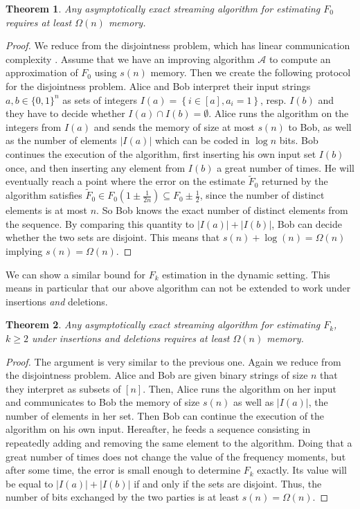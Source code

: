 \documentclass[a4paper,11pt,oneside,english,onecolumn]{article}
\newtheorem{theorem}{Theorem}
\theoremstyle{definition}
\newcommand{\br}[1]{\left\{#1\right\}}                            \renewcommand{\Pr}[1]{\ensuremath{\mathbf{Pr}\left[#1\right]}}
\begin{document}
\begin{theorem}
\label{lem:fzero}
Any asymptotically exact streaming algorithm for estimating $F_0$ requires at least $\Omega(n)$ memory.
\end{theorem}

\begin{proof}
We reduce from the disjointness problem, which has linear communication complexity \cite{Disjointness}. Assume that we have an improving algorithm $\mathcal{A}$ to compute an approximation of $F_0$ using $s(n)$ memory. Then we create the following protocol for the disjointness problem. Alice and Bob interpret their input strings $a,b\in\{0,1\}^n$ as sets of integers $I(a) = \br{i \in [a], a_i = 1}$, resp. $I(b)$ and they have to decide whether $I(a)\cap I(b)=\emptyset$. Alice runs the algorithm on the integers from $I(a)$ and sends the memory of size at most $s(n)$ to Bob, as well as the number of elements $|I(a)|$ which can be coded in $\log n$ bits. Bob continues the execution of the algorithm, first inserting his own input set $I(b)$ once, and then inserting any element from $I(b)$ a great number of times. He will eventually reach a point where the error on the estimate $\tilde F_0$ returned by the algorithm satisfies $\tilde F_0 \in F_0 \left(1 \pm \frac{1}{2n}\right) \subseteq F_0 \pm \frac{1}{2}$, since the number of distinct elements is at most $n$. So Bob knows the exact number of distinct elements from the sequence. By comparing this quantity to $|I(a)| + |I(b)|$, Bob can decide whether the two sets are disjoint. This means that $s(n) + \log(n) = \Omega(n)$ implying $s(n) = \Omega(n)$.
\end{proof}

We can show a similar bound for $F_k$ estimation in the dynamic setting. This means in particular that our above algorithm can not be extended to work under insertions \emph{and} deletions.

\begin{theorem}
\label{lem:fk}
Any asymptotically exact streaming algorithm for estimating $F_k$, $k\geq 2$ under insertions and deletions requires at least $\Omega(n)$ memory.
\end{theorem}

\begin{proof}
The argument is very similar to the previous one. Again we reduce from the disjointness problem. Alice and Bob are given binary strings of size $n$ that they interpret as subsets of $[n]$. Then, Alice runs the algorithm on her input and communicates to Bob the memory of size $s(n)$ as well as $|I(a)|$, the number of elements in her set. Then Bob can continue the execution of the algorithm on his own input. Hereafter, he feeds a sequence consisting in repeatedly adding and removing the same element to the algorithm. Doing that a great number of times does not change the value of the frequency moments, but after some time, the error is small enough to determine $F_k$ exactly. Its value will be equal to $|I(a)| + |I(b)|$ if and only if the sets are disjoint. Thus, the number of bits exchanged by the two parties is at least $s(n) = \Omega(n)$.
\end{proof}
\end{document}
